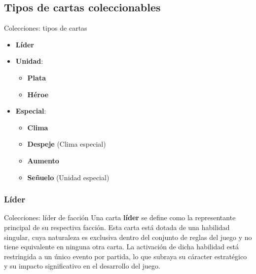\documentclass[a4paper, 12pt]{beamer}
\begin{document}
\subsection{Tipos de cartas coleccionables}
\begin{frame}{\textcolor{plata}{Colecciones: tipos de cartas}}
\begin{itemize}
\item \small \textbf{Líder}
\item \small \textbf{Unidad}: \begin{itemize}
\item \small \textbf{\textcolor{plata}{Plata}}
\item \small \textbf{\textcolor{dorado}{Héroe}}
\end{itemize}
\item \small \textbf{Especial}: \begin{itemize}
\item \small \textbf{Clima}
\item \small \textbf{Despeje} (Clima especial)
\item \small \textbf{Aumento}
\item \small \textbf{Señuelo} (Unidad especial)
\end{itemize}
\end{itemize}
\end{frame}

\subsubsection{Líder}
\begin{frame}{\textcolor{plata}{Colecciones: líder de facción}}
Una carta \textbf{líder} se define como la representante principal de su respectiva facción. Esta carta está dotada de una habilidad singular, cuya naturaleza es exclusiva dentro del conjunto de reglas del juego y no tiene equivalente en ninguna otra carta. La activación de dicha habilidad está restringida a un único evento por partida, lo que subraya su cáracter estratégico y su impacto significativo en el desarrollo del juego.
\end{frame}
\end{document}
